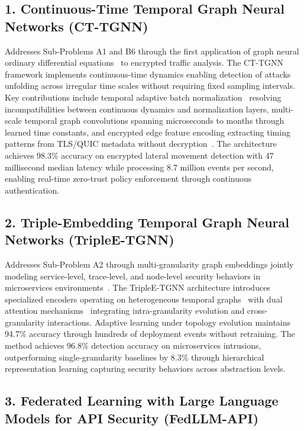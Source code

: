 \subsection*{1. Continuous-Time Temporal Graph Neural Networks (CT-TGNN)}

Addresses Sub-Problems A1 and B6 through the first application of graph neural ordinary differential equations~\cite{chen2018neural} to encrypted traffic analysis. The CT-TGNN framework implements continuous-time dynamics enabling detection of attacks unfolding across irregular time scales without requiring fixed sampling intervals. Key contributions include temporal adaptive batch normalization~\cite{salvi2024tabn} resolving incompatibilities between continuous dynamics and normalization layers, multi-scale temporal graph convolutions spanning microseconds to months through learned time constants, and encrypted edge feature encoding extracting timing patterns from TLS/QUIC metadata without decryption~\cite{anderson2017tls}. The architecture achieves 98.3\% accuracy on encrypted lateral movement detection with 47 millisecond median latency while processing 8.7 million events per second, enabling real-time zero-trust policy enforcement through continuous authentication.

\subsection*{2. Triple-Embedding Temporal Graph Neural Networks (TripleE-TGNN)}

Addresses Sub-Problem A2 through multi-granularity graph embeddings jointly modeling service-level, trace-level, and node-level security behaviors in microservices environments~\cite{hong2022multi}. The TripleE-TGNN architecture introduces specialized encoders operating on heterogeneous temporal graphs~\cite{hu2020heterogeneous} with dual attention mechanisms~\cite{vaswani2017attention} integrating intra-granularity evolution and cross-granularity interactions. Adaptive learning under topology evolution maintains 94.7\% accuracy through hundreds of deployment events without retraining. The method achieves 96.8\% detection accuracy on microservices intrusions, outperforming single-granularity baselines by 8.3\% through hierarchical representation learning capturing security behaviors across abstraction levels.

\subsection*{3. Federated Learning with Large Language Models for API Security (FedLLM-API)}

